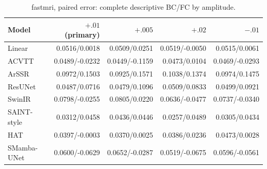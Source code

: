 \begin{table}[t]\centering\scriptsize

\caption{fastmri, paired error: complete descriptive BC/FC by amplitude.}

\begin{tabular}{lrrrr}\toprule Model & $+.01$ (primary) & $+.005$ & $+.02$ & $-.01$\\\midrule

Linear & 0.0516/0.0018 & 0.0509/0.0251 & 0.0519/-0.0050 & 0.0515/0.0061\\

ACVTT & 0.0489/-0.0232 & 0.0449/-0.1159 & 0.0473/0.0104 & 0.0469/-0.0293\\

ArSSR & 0.0972/0.1503 & 0.0925/0.1571 & 0.1038/0.1374 & 0.0974/0.1475\\

ResUNet & 0.0487/0.0716 & 0.0479/0.1096 & 0.0509/0.0833 & 0.0499/0.0921\\

SwinIR & 0.0798/-0.0255 & 0.0805/0.0220 & 0.0636/-0.0477 & 0.0737/-0.0340\\

SAINT-style & 0.0312/0.0458 & 0.0436/0.0446 & 0.0257/0.0489 & 0.0305/0.0434\\

HAT & 0.0397/-0.0003 & 0.0370/0.0025 & 0.0386/0.0236 & 0.0473/0.0028\\

SMamba-UNet & 0.0600/-0.0629 & 0.0652/-0.0287 & 0.0519/-0.0675 & 0.0596/-0.0561\\

\bottomrule\end{tabular}\end{table}

